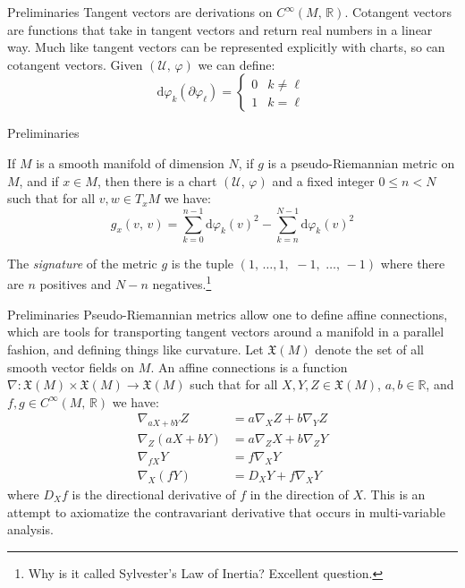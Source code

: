 \documentclass{beamer}
\begin{document}
    \begin{frame}{Preliminaries}
        Tangent vectors are derivations on $C^{\infty}(M,\,\mathbb{R})$.
        Cotangent vectors are functions that take in tangent vectors and
        return real numbers in a linear way. Much like tangent vectors can be
        represented explicitly with charts, so can cotangent vectors. Given
        $(\mathcal{U},\,\varphi)$ we can define:
        \begin{equation}
            \textrm{d}\varphi_{k}(\partial\varphi_{\ell})
            =\begin{cases}
                0&k\ne\ell\\
                1&k=\ell
            \end{cases}
        \end{equation}
    \end{frame}
    \begin{frame}{Preliminaries}
        \begin{theorem}
            If $M$ is a smooth manifold of dimension $N$, if $g$ is a
            pseudo-Riemannian metric on $M$, and if $x\in{M}$, then there is a
            chart $(\mathcal{U},\,\varphi)$ and a fixed integer $0\leq{n}<N$
            such that for all $v,w\in{T}_{x}M$ we have:
            \begin{equation}
                g_{x}(v,\,v)
                =\sum_{k=0}^{n-1}\textrm{d}\varphi_{k}(v)^{2}-
                    \sum_{k=n}^{N-1}\textrm{d}\varphi_{k}(v)^{2}
            \end{equation}
        \end{theorem}
        The \textit{signature} of the metric $g$ is the tuple
        $(1,\,\dots,1,\,\,-1,\,\,\dots,\,-1)$ where there are $n$ positives and
        $N-n$ negatives.\footnote{Why is it called Sylvester's Law of Inertia?
            Excellent question.}
    \end{frame}
    \begin{frame}{Preliminaries}
        Pseudo-Riemannian metrics allow one to define affine connections, which
        are tools for transporting tangent vectors around a manifold in a
        parallel fashion, and defining things like curvature.
        Let $\mathfrak{X}(M)$ denote the set of all smooth vector fields on
        $M$. An affine connections is a function
        $\nabla:\mathfrak{X}(M)\times\mathfrak{X}(M)\rightarrow\mathfrak{X}(M)$
        such that for all $X,Y,Z\in\mathfrak{X}(M)$, $a,b\in\mathbb{R}$, and
        $f,g\in{C}^{\infty}(M,\,\mathbb{R})$ we have:
        \begin{align}
            \nabla_{aX+bY}Z&=a\nabla_{X}Z+b\nabla_{Y}Z\\
            \nabla_{Z}(aX+bY)&=a\nabla_{Z}X+b\nabla_{Z}Y\\
            \nabla_{fX}Y&=f\nabla_{X}Y\\
            \nabla_{X}(fY)&=D_{X}Y+f\nabla_{X}Y
        \end{align}
        where $D_{X}f$ is the directional derivative of $f$ in the direction of
        $X$. This is an attempt to axiomatize the contravariant derivative that
        occurs in multi-variable analysis.
    \end{frame}
\end{document}
